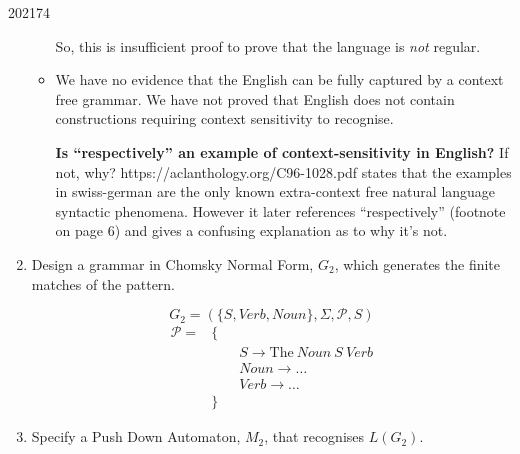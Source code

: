 \documentclass[10pt,\jkfside,a4paper]{article}
\begin{document}
\begin{examquestion}{2021}{7}{4}
\begin{enumerate}[label=(\alph*)]
\begin{itemize}
So, this is insufficient proof to prove that the language is \textit{not}
regular.

\item We have no evidence that the English can be fully captured by a
context free grammar. We have not proved that English does not contain
constructions requiring context sensitivity to recognise.

\textbf{Is ``respectively'' an example of context-sensitivity
in English?} If not, why? https://aclanthology.org/C96-1028.pdf states
that the examples in swiss-german are the only known extra-context free
natural language syntactic phenomena. However it later references
``respectively'' (footnote on page 6) and gives a confusing explanation
as to why it's not.

\end{itemize}

\item Design a grammar in Chomsky Normal Form, $G_2$, which generates the
finite matches of the pattern.

\[
G_2 = \left( \{S, Verb, Noun\}, \Sigma, \mathcal P, S \right)
\]
\begin{align*}
\mathcal P = &\{ \\
&\qquad S \to \text{The}\ Noun\ S\ Verb \\
&\qquad Noun \to \dots \\
&\qquad Verb \to \dots \\
&\}
\end{align*}

\item Specify a Push Down Automaton, $M_2$, that recognises $L(G_2)$.

\begin{figure}[H]
\centering
{}
\end{figure}

\end{enumerate}

\end{examquestion}
\end{document}
